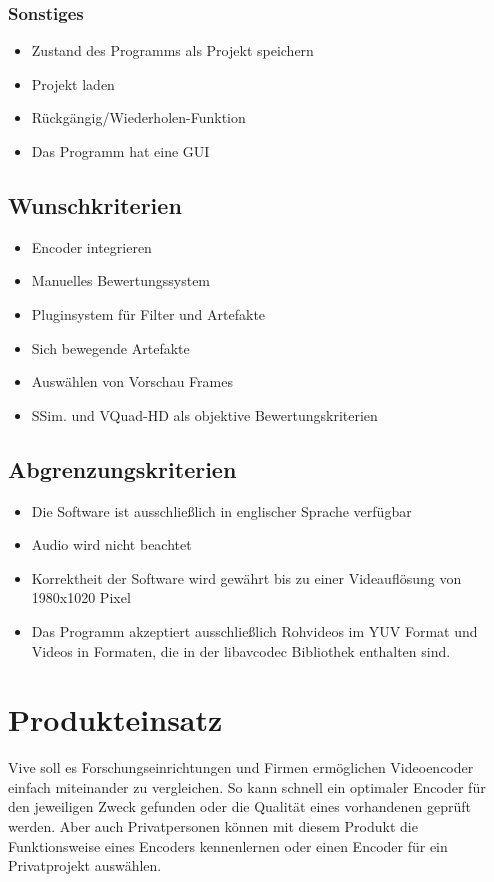 \documentclass[parskip=full]{scrartcl}
\begin{document}
\subsubsection{Sonstiges}
\begin{itemize}
\item Zustand des Programms als Projekt speichern
\item Projekt laden
\item Rückgängig/Wiederholen-Funktion
\item Das Programm hat eine GUI
\end{itemize}
\subsection{Wunschkriterien}
\begin{itemize}
\item Encoder integrieren
\item Manuelles Bewertungssystem
\item Pluginsystem für Filter und Artefakte
\item Sich bewegende Artefakte
\item Auswählen von Vorschau Frames
\item SSim. und VQuad-HD als objektive Bewertungskriterien
\end{itemize}
\subsection{Abgrenzungskriterien}
\begin{itemize}
\item Die Software ist ausschließlich in englischer Sprache verfügbar
\item Audio wird nicht beachtet
\item Korrektheit der Software wird gewährt bis zu einer Videauflösung von 1980x1020 Pixel
\item Das Programm akzeptiert ausschließlich Rohvideos im YUV Format und Videos in Formaten, die in der libavcodec Bibliothek enthalten sind.
\end{itemize}
\newpage
\section{Produkteinsatz}
Vive soll es Forschungseinrichtungen und Firmen ermöglichen Videoencoder einfach
miteinander zu vergleichen. So kann schnell ein optimaler Encoder für den jeweiligen Zweck
gefunden oder die Qualität eines vorhandenen geprüft werden. Aber auch Privatpersonen können
mit diesem Produkt die Funktionsweise eines Encoders kennenlernen oder einen Encoder für ein
Privatprojekt auswählen.
\end{document}

